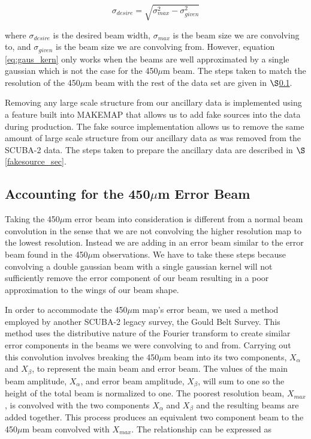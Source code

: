 \begin{equation}\label{eq:gaus_kern}
  \sigma_{desire} = \sqrt{\sigma_{max}^2 - \sigma_{given}^2}
\end{equation}

\noindent where $\sigma_{desire}$ is the desired beam width, $\sigma_{max}$ is the beam size we are convolving to, and $\sigma_{given}$ is the beam size we are convolving from.  However, equation \ref{eq:gaus_kern} only works when the beams are well approximated by a single gaussian which is not the case for the 450$\mu$m beam.  The steps taken to match the resolution of the 450$\mu$m beam with the rest of the data set are given in $\S$\ref{450_fix_sec}.  

Removing any large scale structure from our ancillary data is implemented using a feature built into MAKEMAP that allows us to add fake sources into the data during production.  The fake source implementation allows us to remove the same amount of large scale structure from our ancillary data as was removed from the SCUBA-2 data.  The steps taken to prepare the ancillary data are described in $\S$\ref{fakesource_sec}.


\subsection{Accounting for the 450$\mu$m Error Beam}\label{450_fix_sec}

Taking the 450$\mu$m error beam into consideration is different from a normal beam convolution in the sense that we are not convolving the higher resolution map to the lowest resolution.  Instead we are adding in an error beam similar to the error beam found in the 450$\mu$m observations.  We have to take these steps because convolving a double gaussian beam with a single gaussian kernel will not sufficiently remove the error component of our beam resulting in a poor approximation to the wings of our beam shape.

In order to accommodate the 450$\mu$m map's error beam, we used a method employed by another SCUBA-2 legacy survey, the Gould Belt Survey.  This method uses the distributive nature of the Fourier transform to create similar error components in the beams we were convolving to and from.  Carrying out this convolution involves breaking the 450$\mu$m beam into its two components, $X_{\alpha}$ and $X_{\beta}$, to represent the main beam and error beam.  The values of the main beam amplitude, $X_\alpha$, and error beam amplitude, $X_\beta$, will sum to one so the height of the total beam is normalized to one.  The poorest resolution beam, $X_{max}$, is convolved with the two components $X_\alpha$ and $X_\beta$ and the resulting beams are added together.  This process produces an equivalent two component beam to the 450$\mu$m beam convolved with $X_{max}$.  The relationship can be expressed as 

